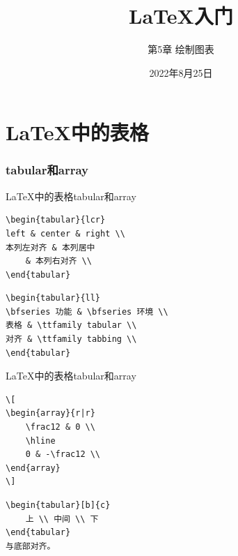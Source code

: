 \documentclass[11pt]{beamer}
\begin{document}
	\title{\LaTeX 入门}
	\subtitle{第5章 绘制图表}
	\date{2022年8月25日}
	\begin{frame}[plain]
		\maketitle
	\end{frame}
	
\part{\LaTeX 中的表格}	

\section{tabular和array}

\begin{frame}[fragile]{\LaTeX 中的表格}{tabular和array}
\begin{lstlisting}
\begin{tabular}{lcr}
left & center & right \\
本列左对齐 & 本列居中
	& 本列右对齐 \\
\end{tabular}
\end{lstlisting}
\begin{lstlisting}
\begin{tabular}{ll}
\bfseries 功能 & \bfseries 环境 \\
表格 & \ttfamily tabular \\
对齐 & \ttfamily tabbing \\
\end{tabular}
\end{lstlisting}
\end{frame}

\begin{frame}[fragile]{\LaTeX 中的表格}{tabular和array}
\begin{lstlisting}
\[
\begin{array}{r|r}
	\frac12 & 0 \\
	\hline
	0 & -\frac12 \\
\end{array}
\]
\end{lstlisting}
\begin{lstlisting}
\begin{tabular}[b]{c}
	上 \\ 中间 \\ 下
\end{tabular}
与底部对齐。
\end{lstlisting}
\end{frame}
\end{document}
